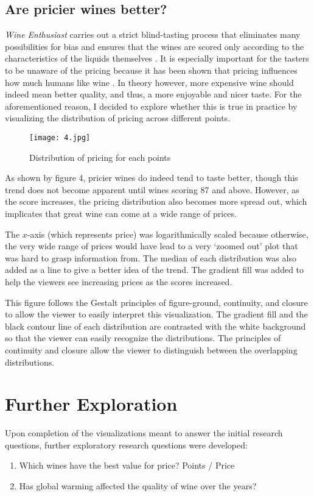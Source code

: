 \subsection{Are pricier wines better?}
\emph{Wine Enthusiast} carries out a strict blind-tasting process that eliminates many possibilities for bias and ensures that the wines are scored only according to the characteristics of the liquids themselves \cite{WineMag}. It is especially important for the tasters to be unaware of the pricing because it has been shown that pricing influences how much humans like wine \cite{SchmidtSkvortsova2017}. In theory however, more expensive wine should indeed mean better quality, and thus, a more enjoyable and nicer taste. For the aforementioned reason, I decided to explore whether this is true in practice by visualizing the distribution of pricing across different points.


\begin{figure}[h]
  \texttt{[image: 4.jpg]} 
  \caption{Distribution of pricing for each points} %
\end{figure}

As shown by figure 4, pricier wines do indeed tend to taste better, though this trend does not become apparent until wines scoring 87 and above. However, as the score increases, the pricing distribution also becomes more spread out, which implicates that great wine can come at a wide range of prices.

The $x$-axis (which represents price) was logarithmically scaled because otherwise, the very wide range of prices would have lead to a very `zoomed out' plot that was hard to grasp information from. The median of each distribution was also added as a line to give a better idea of the trend. The gradient fill was added to help the viewers see increasing prices as the scores increased.

This figure follows the Gestalt principles of figure-ground, continuity, and closure to allow the viewer to easily interpret this visualization. The gradient fill and the black contour line of each distribution are contrasted with the white background so that the viewer can easily recognize the distributions. The principles of continuity and closure allow the viewer to distinguish between the overlapping distributions.



\section{Further Exploration}

Upon completion of the visualizations meant to answer the initial research questions, further exploratory research questions were developed:

\begin{enumerate}
  \item Which wines have the best value for price? Points / Price
  \item Has global warming affected the quality of wine over the years?
\end{enumerate}


